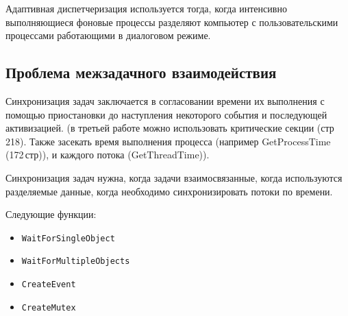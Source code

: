 Адаптивная диспетчеризация используется тогда, когда интенсивно выполняющиеся
фоновые процессы разделяют компьютер с пользовательскими процессами работающими
в диалоговом режиме.

\subsection{Проблема межзадачного взаимодействия}
Синхронизация задач заключается в согласовании времени их выполнения с помощью
приостановки до наступления некоторого события и последующей активизацией.  (в
третьей работе можно использовать критические секции (стр\, 218). Также засекать
время выполнения процесса (например GetProcessTime (172\,стр)), и каждого потока
(GetThreadTime)).

Синхронизация задач нужна, когда задачи взаимосвязанные, когда используются
разделяемые данные, когда необходимо синхронизировать потоки по времени.

Следующие функции:
\begin{itemize}
  \item \verb!WaitForSingleObject!
  \item \verb!WaitForMultipleObjects!
  \item \verb!CreateEvent!
  \item \verb!CreateMutex!
\end{itemize}

